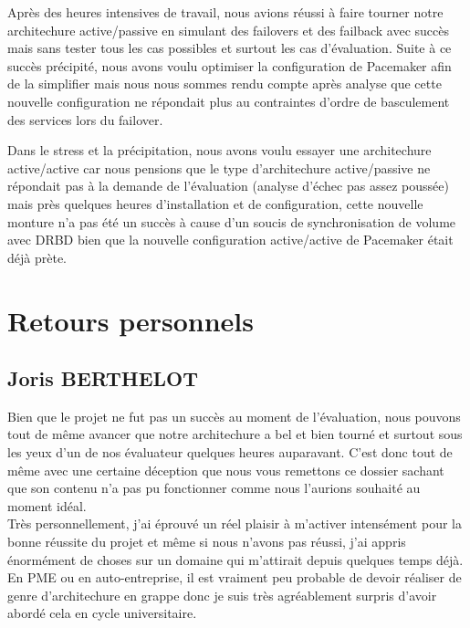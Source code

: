 \documentclass[11pt,a4paper]{report}
\begin{document}
            Apr\`es des heures intensives de travail, nous avions r\'eussi \`a faire tourner notre architechure active/passive en simulant des failovers et des failback avec succ\`es mais sans tester tous les cas possibles et surtout les cas d'\'evaluation. Suite \`a ce succ\`es pr\'ecipit\'e, nous avons voulu optimiser la configuration de Pacemaker afin de la simplifier mais nous nous sommes rendu compte apr\`es analyse que cette nouvelle configuration ne r\'epondait plus au contraintes d'ordre de basculement des services lors du failover.
            
            Dans le stress et la pr\'ecipitation, nous avons voulu essayer une architechure active/active car nous pensions que le type d'architechure active/passive ne r\'epondait pas \`a la demande de l'\'evaluation (analyse d'\'echec pas assez pouss\'ee) mais pr\`es quelques heures d'installation et de configuration, cette nouvelle monture n'a pas \'et\'e un succ\`es \`a cause d'un soucis de synchronisation de volume avec DRBD bien que la nouvelle configuration active/active de Pacemaker \'etait d\'ej\`a pr\`ete.
            
        \section{Retours personnels}
            
            \subsection{Joris \textsc{BERTHELOT}}
                
                Bien que le projet ne fut pas un succ\`es au moment de l'\'evaluation, nous pouvons tout de m\^eme avancer que notre architechure a bel et bien tourn\'e et surtout sous les yeux d'un de nos \'evaluateur quelques heures auparavant. C'est donc tout de m\^eme avec une certaine d\'eception que nous vous remettons ce dossier sachant que son contenu n'a pas pu fonctionner comme nous l'aurions souhait\'e au moment id\'eal.\\
                
                Tr\`es personnellement, j'ai \'eprouv\'e un r\'eel plaisir \`a m'activer intens\'ement pour la bonne r\'eussite du projet et m\^eme si nous n'avons pas r\'eussi, j'ai appris \'enorm\'ement de choses sur un domaine qui m'attirait depuis quelques temps d\'ej\`a. En PME ou en auto-entreprise, il est vraiment peu probable de devoir r\'ealiser de genre d'architechure en grappe donc je suis tr\`es agr\'eablement surpris d'avoir abord\'e cela en cycle universitaire.
                
\end{document}
